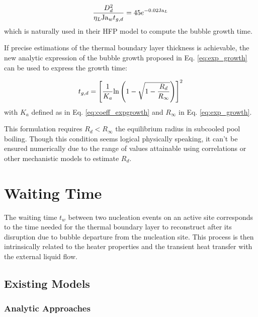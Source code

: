 \begin{equation}
\frac{D_{d}^{2}}{\eta_{L}\mathrm{Ja}_{w}t_{g,d}} = 45  e^{-0.02\mathrm{Ja}_{L}}
\end{equation}
which is naturally used in their HFP model to compute the bubble growth time.

\npar


\begin{remark*}{}
If precise estimations of the thermal boundary layer thickness is achievable, the new analytic expression of the bubble growth proposed in Eq. \ref{eq:exp_growth} can be used to express the growth time:

\begin{equation}
t_{g,d} = \left[ \frac{1}{K_{a}} \mathrm{ln}\left( 1-\sqrt{1-\dfrac{R_{d}}{R_{\infty}}}  \right)  \right]^{2}
\end{equation}
with $K_{a}$ defined as in Eq. \ref{eq:coeff_expgrowth} and $R_{\infty}$ in Eq. \ref{eq:exp_growth}.

\npar
This formulation requires $R_{d} < R_{\infty}$ the equilibrium radius in subcooled pool boiling. Though this condition seems logical physically speaking, it can't be ensured numerically due to the range of values attainable using correlations or other mechanistic models to estimate $R_{d}$.
\end{remark*}





\section{Waiting Time}
\label{sec:wait_time}

The waiting time $t_{w}$ between two nucleation events on an active site corresponds to the time needed for the thermal boundary layer to reconstruct after its disruption due to bubble departure from the nucleation site. This process is then intrinsically related to the heater properties and the transient heat transfer with the external liquid flow.



\subsection{Existing Models}

\subsubsection{Analytic Approaches}

